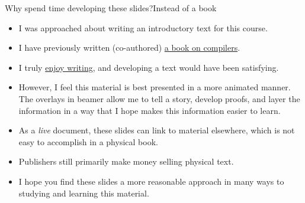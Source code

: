 \begin{frame}{Why spend time developing these slides?}{Instead of a book}
\begin{itemize}
    \item I was approached about writing an introductory text for this course.
    \item I have previously written (co-authored) \href{https://www.amazon.com/Crafting-Compiler-Charles-N-Fischer/dp/0136067050}{a book on compilers}.
    \item I truly \href{https://www.cse.wustl.edu/~cytron/FAQ/writers.html}{enjoy writing}, and developing a text would have been satisfying.
    \item However, I feel this material is best presented in a more animated manner.  The overlays in beamer allow me to tell a story, develop proofs, and layer the information in a way that I hope makes this information easier to learn.
    \item As a \emph{live} document, these slides can link to material elsewhere, which is not easy to accomplish in a physical book.
    \item Publishers still primarily make money selling physical text.
    \item I hope you find these slides a more reasonable approach in many ways to studying and learning this material.
\end{itemize}
\end{frame}

